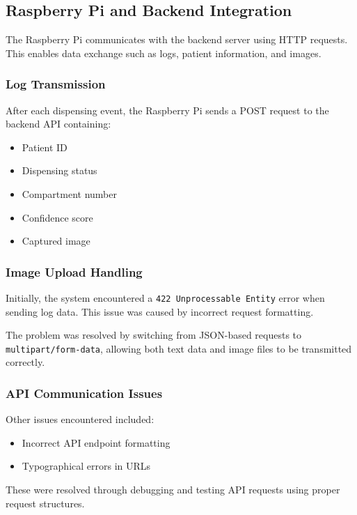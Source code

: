 \subsection{Raspberry Pi and Backend Integration}

The Raspberry Pi communicates with the backend server using HTTP requests. This enables data exchange such as logs, patient information, and images.

\subsubsection{Log Transmission}

After each dispensing event, the Raspberry Pi sends a POST request to the backend API containing:

\begin{itemize}
    \item Patient ID
    \item Dispensing status
    \item Compartment number
    \item Confidence score
    \item Captured image
\end{itemize}

\subsubsection{Image Upload Handling}

Initially, the system encountered a \texttt{422 Unprocessable Entity} error when sending log data. This issue was caused by incorrect request formatting.

The problem was resolved by switching from JSON-based requests to \texttt{multipart/form-data}, allowing both text data and image files to be transmitted correctly.

\subsubsection{API Communication Issues}

Other issues encountered included:

\begin{itemize}
    \item Incorrect API endpoint formatting
    \item Typographical errors in URLs
\end{itemize}

These were resolved through debugging and testing API requests using proper request structures.

